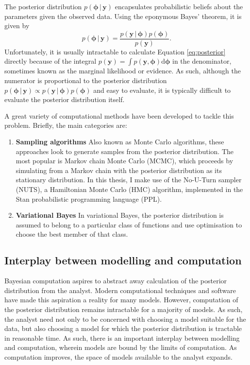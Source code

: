 \documentclass[a4paper, nobind]{templates/ociamthesis}
\providecommand{\tightlist}{%
  \setlength{\itemsep}{0pt}\setlength{\parskip}{0pt}}
\newcommand{\y}{\mathbf{y}}
\newcommand{\bphi}{\bm{\phi}}
\begin{document}
The posterior distribution \(p(\bphi \, | \, \y)\) encapsulates probabilistic beliefs about the parameters given the observed data.
Using the eponymous Bayes' theorem, it is given by
\begin{equation}
p(\bphi \, | \, \y) = \frac{p(\y \, | \, \bphi) p(\bphi)}{p(\y)}. \label{eq:posterior}
\end{equation}
Unfortunately, it is usually intractable to calculate Equation \ref{eq:posterior} directly because of the integral \(p(\y) = \int p(\y, \bphi) \text{d}\bphi\) in the denominator, sometimes known as the marginal likelihood or evidence.
As such, although the numerator is proportional to the posterior distribution \(p(\bphi \, | \, \y) \propto p(\y \, | \, \bphi) p(\bphi)\) and easy to evaluate, it is typically difficult to evaluate the posterior distribution itself.

A great variety of computational methods have been developed to tackle this problem.
Briefly, the main categories are:

\begin{enumerate}
\def\labelenumi{\arabic{enumi}.}
\tightlist
\item
  \textbf{Sampling algorithms} Also known as Monte Carlo algorithms, these approaches look to generate samples from the posterior distribution.
  The most popular is Markov chain Monte Carlo (MCMC), which proceeds by simulating from a Markov chain with the posterior distribution as its stationary distribution.
  In this thesis, I make use of the No-U-Turn sampler (NUTS), a Hamiltonian Monte Carlo (HMC) algorithm, implemented in the Stan probabilistic programming language (PPL).
\item
  \textbf{Variational Bayes} In variational Bayes, the posterior distribution is assumed to belong to a particular class of functions and use optimisation to choose the best member of that class.
\end{enumerate}

\hypertarget{interplay-between-modelling-and-computation}{%
\subsection{Interplay between modelling and computation}\label{interplay-between-modelling-and-computation}}

Bayesian computation aspires to abstract away calculation of the posterior distribution from the analyst.
Modern computational techniques and software have made this aspiration a reality for many models.
However, computation of the posterior distribution remains intractable for a majority of models.
As such, the analyst need not only to be concerned with choosing a model suitable for the data, but also choosing a model for which the posterior distribution is tractable in reasonable time.
As such, there is an important interplay between modelling and computation, wherein models are bound by the limits of computation.
As computation improves, the space of models available to the analyst expands.
\end{document}
